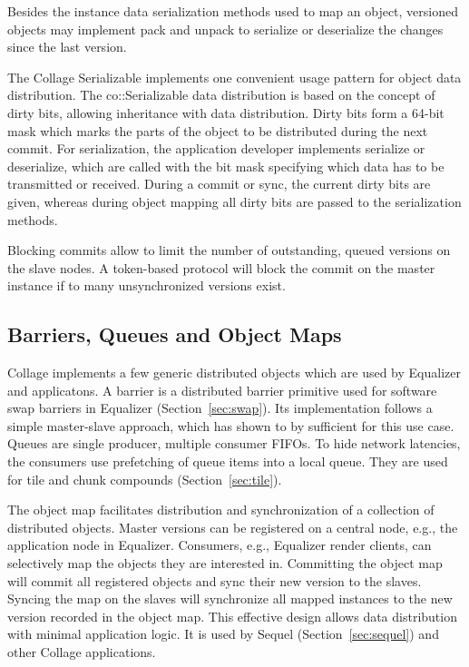 \documentclass[10pt,journal,compsoc]{IEEEtran}
\newcommand{\sref}[1]{Section~\ref{#1}}
\begin{document}
Besides the instance data serialization methods used to map an object, versioned
objects may implement \textsf{pack} and \textsf{unpack} to serialize or
deserialize the changes since the last version.

The Collage Serializable implements one convenient usage pattern for object data
distribution. The \textsf{co::Serializable} data distribution is based on the
concept of dirty bits, allowing inheritance with data distribution. Dirty bits
form a 64-bit mask which marks the parts of the object to be distributed during
the next commit. For serialization, the application developer implements
\textsf{serialize} or \textsf{deserialize}, which are called with the bit mask
specifying which data has to be transmitted or received. During a commit or
sync, the current dirty bits are given, whereas during object mapping all dirty
bits are passed to the serialization methods.

Blocking commits allow to limit the number of outstanding, queued versions on
the slave nodes. A token-based protocol will block the commit on the master
instance if to many unsynchronized versions exist.

\subsection{Barriers, Queues and Object Maps}\label{SEC_barrier}

Collage implements a few generic distributed objects which are used by Equalizer
and applicatons. A barrier is a distributed barrier primitive used for software
swap barriers in Equalizer (\sref{sec:swap}). Its implementation follows a
simple master-slave approach, which has shown to by sufficient for this use
case. Queues are single producer, multiple consumer FIFOs. To hide network
latencies, the consumers use prefetching of queue items into a local queue. They
are used for tile and chunk compounds (\sref{sec:tile}).

The object map facilitates distribution and synchronization of a collection of
distributed objects. Master versions can be registered on a central node, e.g.,
the application node in Equalizer. Consumers, e.g., Equalizer render clients,
can selectively map the objects they are interested in. Committing the object
map will commit all registered objects and sync their new version to the
slaves. Syncing the map on the slaves will synchronize all mapped instances to
the new version recorded in the object map. This effective design allows data
distribution with minimal application logic. It is used by Sequel
(\sref{sec:sequel}) and other Collage applications.
\end{document}
